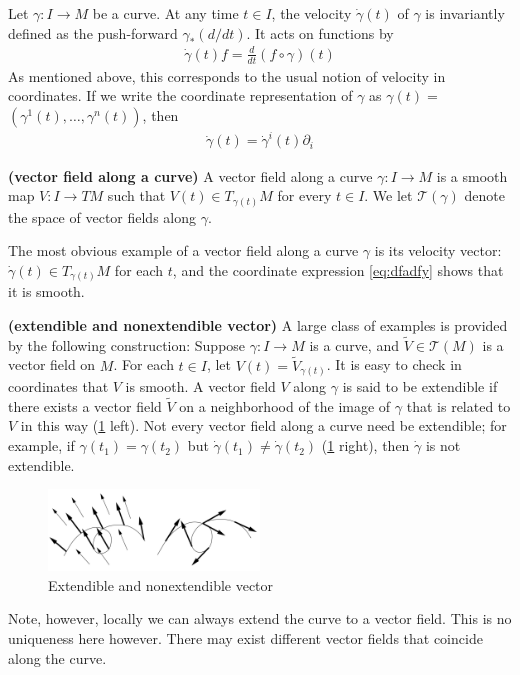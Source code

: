 \documentclass[12pt]{article} %
\newcommand{\bfs}[1]{\textbf{({#1}) }}
\begin{document}
Let $\gamma: I \rightarrow M$ be a curve. At any time $t \in I$, the velocity $\dot{\gamma}(t)$ of $\gamma$ is invariantly defined as the push-forward $\gamma_{*}(d / d t)$. It acts on functions by
\begin{align*}
\dot{\gamma}(t) f=\frac{d}{d t}(f \circ \gamma)(t)
\end{align*}
As mentioned above, this corresponds to the usual notion of velocity in coordinates. If we write the coordinate representation of $\gamma$ as $\gamma(t)=$ $\left(\gamma^{1}(t), \ldots, \gamma^{n}(t)\right)$, then
\begin{align}
\dot{\gamma}(t)=\dot{\gamma}^{i}(t) \partial_{i}\label{eq:dfadfy}
\end{align}
\begin{defa}\bfs{vector field along a curve}
A vector field along a curve $\gamma: I \rightarrow M$ is a smooth map $V: I \rightarrow T M$ such that $V(t) \in T_{\gamma(t)} M$ for every $t \in I$. We let $\mathcal{T}(\gamma)$ denote the space of vector fields along $\gamma$. 
\end{defa}
\begin{exma}
The most obvious example of a vector field along a curve $\gamma$ is its velocity vector: $\dot{\gamma}(t) \in T_{\gamma(t)} M$ for each $t$, and the coordinate expression \cref{eq:dfadfy} shows that it is smooth. \end{exma}
\begin{defa}\bfs{extendible and nonextendible vector}
 A large class of examples is provided by the following construction: Suppose $\gamma: I \rightarrow M$ is a curve, and $\widetilde{V} \in \mathcal{T}(M)$ is a vector field on $M$. For each $t \in I$, let $V(t)=\widetilde{V}_{\gamma(t)}$. It is easy to check in coordinates that $V$ is smooth. A vector field $V$ along $\gamma$ is said to be extendible if there exists a vector field $\widetilde{V}$ on a neighborhood of the image of $\gamma$ that is related to $V$ in this way (\cref{fig:trgfdsf} left). Not every vector field along a curve need be extendible; for example, if $\gamma\left(t_{1}\right)=\gamma\left(t_{2}\right)$ but $\dot{\gamma}\left(t_{1}\right) \neq \dot{\gamma}\left(t_{2}\right)$ (\cref{fig:trgfdsf} right), then $\dot{\gamma}$ is not extendible.
 \begin{figure}[ht]
    \centering
    \includegraphics[width=0.5\textwidth]{Figs/3.png}
    \caption{Extendible and nonextendible vector}
    \label{fig:trgfdsf}
\end{figure}
\end{defa}
\begin{rema}
Note, however, locally we can always extend the curve to a vector field. This is no uniqueness here however. There may exist different vector fields that coincide along the curve.
\end{rema}
\end{document}
